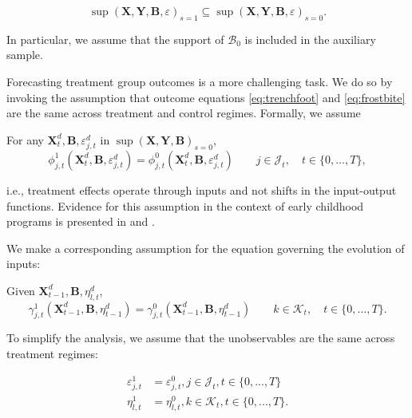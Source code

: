 \begin{assumption} \label{ass:contain}
\begin{equation*}
\sup(\bm{X}, \bm{Y}, \bm{B}, \varepsilon)_{s=1} \subseteq \sup (\bm{X}, \bm{Y}, \bm{B}, \varepsilon)_{s=0}.
\end{equation*}
\end{assumption}
In particular, we assume that the support of $\mathcal{B}_0$ is included in the auxiliary sample.

Forecasting treatment group outcomes is a more challenging task. We do so by invoking the assumption that outcome equations \eqref{eq:trenchfoot} and \eqref{eq:frostbite} are the same across treatment and control regimes. Formally, we assume

\renewcommand\theassumption{A--\arabic{assumption}(a)}
\begin{assumption}\label{ass:eczema}
For any $\bm{X}^d_t, \bm{B}, \varepsilon^d_{j,t}$ in $\sup(\bm{X},\bm{Y},\bm{B})_{s=0}$,
\begin{equation*}
\phi^1_{j,t} (\bm{X}^d_t, \bm{B}, \varepsilon^d_{j,t}) = \phi^0_{j,t} (\bm{X}^d_t, \bm{B}, \varepsilon^d_{j,t}) \qquad j \in \mathcal J_t, \quad t \in \{0,\dots,T\},
\end{equation*}
\end{assumption}
i.e., treatment effects operate through inputs and not shifts in the input-output functions. Evidence for this assumption in the context of early childhood programs is presented in \citet{Heckman_Pinto_etal_2013_PerryFactor} and \citet{Attanasio-etal_2015_NBER_Estimating-Production}.

We make a corresponding assumption for the equation governing the evolution of inputs:
\addtocounter{assumption}{-1}
\renewcommand\theassumption{A--\arabic{assumption}(b)}
\begin{assumption}\label{ass:psoriasis}
Given $\bm{X}^d_{t-1}, \bm{B}, \eta^d_{l,t}$,
\begin{equation*}
\gamma^1_{j,t} (\bm{X}^d_{t-1}, \bm{B}, \eta^d_{t-1}) = \gamma^0_{j,t} (\bm{X}^d_{t-1}, \bm{B}, \eta^d_{t-1}) \qquad k \in \mathcal{K}_t, \quad t \in \{0,\dots,T\}.
\end{equation*}
\end{assumption}
To simplify the analysis, we assume that the unobservables are the same across treatment regimes:

\renewcommand\theassumption{A--\arabic{assumption}}
\begin{assumption}\label{ass:fox}
\begin{align*}
\varepsilon^{1}_{j,t} &= \varepsilon^{0}_{j,t} , j \in \mathcal{J}_t, t \in \{ 0,..., T\} \\
\eta^{1}_{l,t} &= \eta^{0}_{l,t} , k \in \mathcal{K}_t, t \in \{0,...,T\}.
\end{align*}
\end{assumption}

